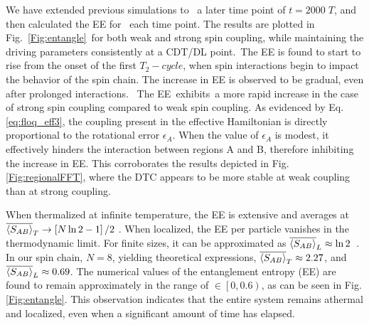 \documentclass[12pt]{iopart}
\begin{document}
We have extended previous simulations to  a later time point of $t=2000\;T$, and then calculated the EE for  each time point. The results are plotted in Fig.~\ref{Fig:entangle} for both weak and strong spin coupling, while maintaining the driving parameters consistently at a CDT/DL point. The EE is found to start to rise from the onset of the first $T_2-cycle$, when spin interactions begin to impact the behavior of the spin chain. The increase in EE is observed to be gradual, even after prolonged interactions.  The EE exhibits a more rapid increase in the case of strong spin coupling compared to weak spin coupling. As evidenced by Eq.\eqref{eq:floq_eff3}, the coupling present in the effective Hamiltonian is directly proportional to the rotational error $\epsilon_A$. When the value of $\epsilon_A$ is modest, it effectively hinders the interaction between regions A and B, therefore inhibiting the increase in EE. This corroborates the results depicted in Fig.\ref{Fig:regionalFFT}, where the DTC appears to be more stable at weak coupling than at strong coupling.	
	
When thermalized at infinite temperature, the EE is extensive and averages at $\displaystyle \overline{\expval{S_{AB}}}_T\rightarrow \left[N \ln{2}-1\right]/2$ \cite{Lu2021}. When localized, the EE per particle vanishes in the thermodynamic limit. For finite sizes, it can be approximated as $\overline{\expval{S_{AB}}}_L\approx \ln{2}$~\cite{sakurai_phys_nodate}. In our spin chain, $N=8$, yielding theoretical expressions, $\overline{\expval{S_{AB}}}_T\approx 2.27$, and $\overline{\expval{S_{AB}}}_L\approx 0.69$. The numerical values of the entanglement entropy (EE) are found to remain approximately in the range of $\in\left[0,0.6\right)$, as can be seen in Fig.\ref{Fig:entangle}. This observation indicates that the entire system remains athermal and localized, even when a significant amount of time has elapsed.
	
\end{document}
